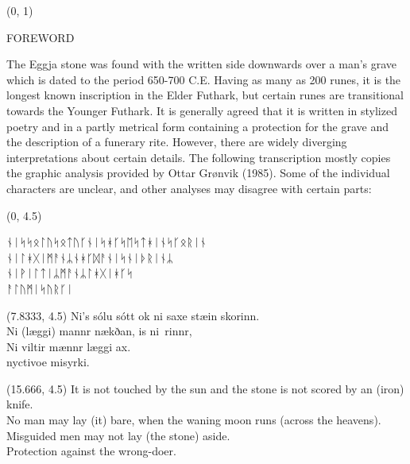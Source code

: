 \documentclass[11pt]{article}
\begin{document}
\begin{textblock}{23}(0, 1)
\begin{center}
\huge FOREWORD
\end{center}
\end{textblock}

\vspace*{0.25\baselineskip}

\begingroup

\begin{center}
The Eggja stone was found with the written side downwards over a man's grave which is dated to the period 650-700 C.E. Having as many as 200 runes, it is the longest known inscription in the Elder Futhark, but certain runes are transitional towards the Younger Futhark. It is generally agreed that it is written in stylized poetry and in a partly metrical form containing a protection for the grave and the description of a funerary rite. However, there are widely diverging interpretations about certain details. The following transcription mostly copies the graphic analysis provided by Ottar Grønvik (1985). Some of the individual characters are unclear, and other analyses may disagree with certain parts:
\rightskip\leftskip
\phantom{text} \hfill \phantom{()}
\end{center}

\begin{textblock}{7.333}(0, 4.5)

\setmainfont{Noto Sans Runic}
ᚾᛁᛋᛋᛟᛚᚢᛋᛟᛏᚢᚴᚾᛁᛋᚼᚴᛋᛖᛋᛏᚼᛁᚾᛋᚴᛟᚱᛁᚾ \\
\hfill \break
ᚾᛁᛚᚼᚷᛁᛗᚨᚾᛦᚾᚼᚴᛞᚨᚾᛁᛋᚾᛁᚦᚱᛁᚾᛦ\\
\hfill \break
ᚾᛁᚹᛁᛚᛏᛁᛦᛗᚨᚾᛦᛚᚼᚷᛁᚼᚴᛋ\\
  \hfill \break
ᚨᛚᚢᛗᛁᛋᚢᚱᚴᛁ\\
\rightskip\leftskip
\phantom{text} \hfill

\end{textblock}

\begin{textblock}{7.333}(7.8333, 4.5)
\setmainfont{Bell MT}
Ni's sólu sótt ok ni saxe stæin skorinn. \\
\hfill \break
Ni (læggi) mannr nækðan, is ni\Thorn \ rinnr, \\
\hfill \break
Ni viltir mænnr læggi ax. \\
\hfill \break
nyctivoe misyrki. \\
\end{textblock}

\begin{textblock}{7.333}(15.666, 4.5)
It is not touched by the sun and the stone is not scored by an (iron) knife. \\
No man may lay (it) bare, when the waning moon runs (across the heavens). \\
Misguided men may not lay (the stone) aside. \\
\hfill \break
Protection against the wrong-doer.
\end{textblock}
\end{document}
